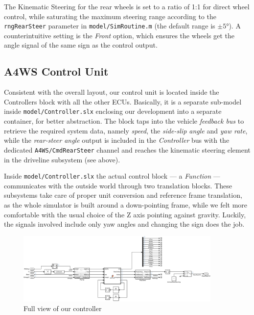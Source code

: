 		The Kinematic Steering for the rear wheels is set to a ratio of 1:1 for direct wheel control, while saturating the maximum steering range according to the
		\lstinline{rngRearSteer} parameter in \texttt{model/SimRoutine.m} (the default range is $\pm\ang{5}$). A counterintuitive setting is the \emph{Front} option,
		which ensures the wheels get the angle signal of the same sign as the control output.


		\subsection{A4WS Control Unit}
		\label{ssec:vs-int-ctrl}

		Consistent with the overall layout, our \emph{\awwwws} control unit is located inside the Controllers block with all the other ECUs.
		Basically, it is a separate \mwSL{} sub-model inside \texttt{model/Controller.slx} enclosing our development into a separate container, for better abstraction.
		The block taps into the vehicle \emph{feedback bus} to retrieve the required system data, namely \emph{speed}, the \emph{side-slip angle} and \emph{yaw rate},
		while the \emph{rear-steer angle} output is included in the \emph{Controller} bus with the dedicated \lstinline{A4WS/CmdRearSteer} channel and reaches the kinematic
		steering element in the driveline subsystem (see above).

		Inside \texttt{model/Controller.slx} the actual control block --- a \emph{\mwML{} Function} --- communicates with the outside world through two translation blocks.
		These subsystems take care of proper unit conversion and reference frame translation, as the whole simulator is built around a down-pointing frame, while we felt
		more comfortable with the usual choice of the Z axis pointing against gravity. Luckily, the signals involved include only yaw angles and changing the sign does the job.
		\begin{figure}[hbt]
			\centering
			\includegraphics[width=0.9\textwidth]{Images/Simulator/a4ws-full}
			\caption{Full view of our \awwwws controller}
			\label{fig:ctrl-a4ws-full}
		\end{figure}

